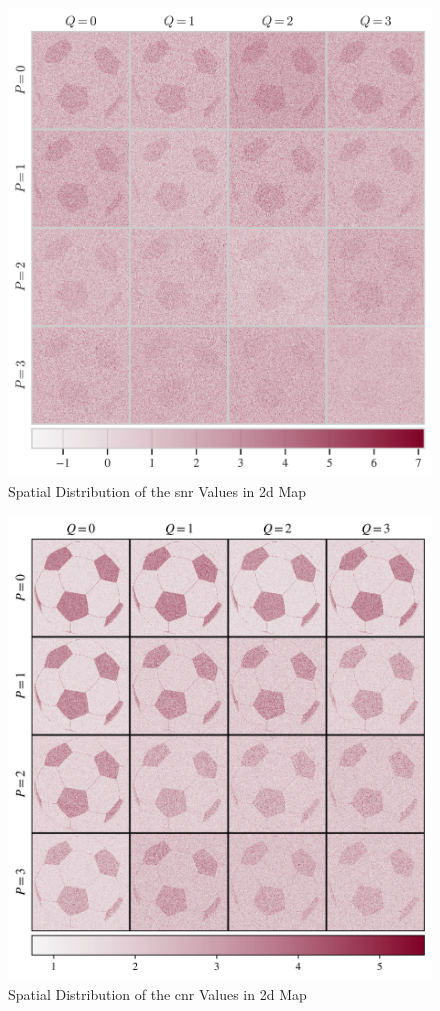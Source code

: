 \begin{figure}[htbp!]
\centering
\includegraphics{images/snr2D_Spatial.png}
\caption{Spatial Distribution of the \gls{snr} Values in \gls{2d} Map}
\label{fig:snr2DSpatial}
\end{figure}

\begin{figure}[htbp!]
\centering
\includegraphics{images/cnr2D_Spatial.png}
\caption{Spatial Distribution of the \gls{cnr} Values in \gls{2d} Map}
\label{fig:cnr2DSpatial}
\end{figure}

